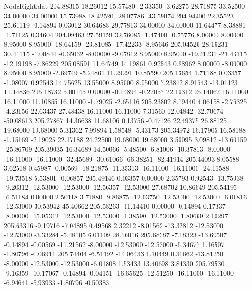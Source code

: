 \begin{filecontents}{NodeRight.dat}
 204.88315   18.26012   15.57480    -2.33350   -3.62275   28.71875   33.52500   34.00000   34.00000   15.73988   18.42520  -28.07786  -43.59074
 204.94400   22.35523   25.61119    -0.14894    0.03012   30.64688   29.77813   34.00000   34.00000   11.64477    8.38881   -1.71125    0.34604
 204.99463   27.59159   32.76085    -1.47400   -0.75776    8.00000    8.00000    8.95000    8.95000  -18.64159  -23.81085  -17.42233   -8.95646
 205.04526   28.16231   30.41115    -1.00844   -0.65032   -8.00000   -9.07812    8.95000    8.95000  -19.21231  -21.46115  -12.19198   -7.86229
 205.08591   11.64749   14.19861     0.92543    0.88962    8.00000   -8.00000    8.95000    8.95000   -2.69749   -5.24861   11.29291   10.85590
 205.13654    1.71188    0.03357    -1.08007    0.92543   14.75625   13.55000    8.95000    8.95000    7.23812    8.91643  -13.01123   11.14836
 205.18732    5.00145    0.00000    -0.14894   -0.22057   22.10312   25.14062   16.11000   16.11000   11.10855   16.11000   -1.79025   -2.65116
 205.23802    8.79440    4.06158    -2.76325   -4.23156   22.63437   27.48438   16.11000   16.11000    7.31560   12.04842  -32.70674  -50.08613
 205.27867   14.36638   11.68106     0.13756   -0.47126   22.49375   26.88125   19.68000   19.68000    5.31362    7.99894    1.58548   -5.43173
 205.34972   16.17905   16.58188    -1.15169   -2.19025   22.17188   24.22500   19.68000   19.68000    3.50095    3.09812  -13.60159  -25.86709
 205.39035   16.34689   14.50066    -5.48500   -6.81006  -10.37813   -8.00000  -16.11000  -16.11000  -32.45689  -30.61066  -66.38251  -82.41914
 205.44093    8.05588    3.62518     0.45987   -0.00569  -18.21875  -11.35313  -16.11000  -16.11000  -24.16588  -19.73518    5.53801   -0.06857
 205.49146    0.03357    0.00000     2.35793    0.92543  -13.75938   -9.20312  -12.53000  -12.53000  -12.56357  -12.53000   27.68702   10.86649
 205.54195   -6.51184    0.00000     2.50118    3.71880   -9.86875  -12.03750  -12.53000  -12.53000   -6.01816  -12.53000   30.53942   45.40662
 205.58263  -11.14410    0.00000    -0.14894    0.17337   -8.00000  -15.95312  -12.53000  -12.53000   -1.38590  -12.53000   -1.80669    2.10297
 205.63316   -9.19716   -7.04895     0.49568    2.32212   -8.01562  -13.32812  -12.53000  -12.53000   -3.33284   -5.48105    6.01109   28.16016
 205.68387   -7.18323  -13.69507    -0.14894   -0.00569  -11.21562   -8.00000  -12.53000  -12.53000   -5.34677    1.16507   -1.80796   -0.06911
 205.74464   -6.51192  -14.06433     1.10449    0.31662  -13.81250   -8.00000  -12.53000  -12.53000   -6.01808    1.53433   13.40698    3.84330
 205.79530   -9.16359  -10.17067    -0.14894   -0.04151  -16.65625  -12.51250  -16.11000  -16.11000   -6.94641   -5.93933   -1.80796   -0.50383

\end{filecontents}
